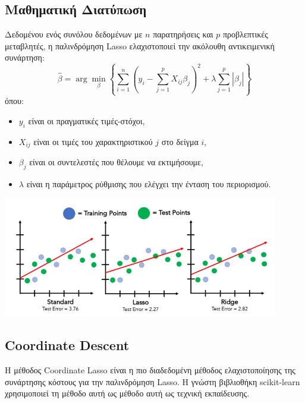\documentclass[12pt]{article}
\begin{document}
\subsection{Μαθηματική Διατύπωση}
Δεδομένου ενός συνόλου δεδομένων με $n$ παρατηρήσεις και $p$ προβλεπτικές μεταβλητές, η παλινδρόμηση \textlatin{Lasso} ελαχιστοποιεί την ακόλουθη αντικειμενική συνάρτηση:
\begin{equation}
    \hat{\beta} = \arg \min_{\beta} \left\{ \sum_{i=1}^{n} (y_i - \sum_{j=1}^{p} X_{ij} \beta_j)^2 + \lambda \sum_{j=1}^{p} |\beta_j| \right\}
\end{equation}
όπου:
\begin{itemize}
    \item $y_i$ είναι οι πραγματικές τιμές-στόχοι,
    \item $X_{ij}$ είναι οι τιμές του χαρακτηριστικού $j$ στο δείγμα $i$,
    \item $\beta_j$ είναι οι συντελεστές που θέλουμε να εκτιμήσουμε,
    \item $\lambda$ είναι η παράμετρος ρύθμισης που ελέγχει την ένταση του περιορισμού.
\end{itemize}

\begin{center}
    \includegraphics[width=0.9\textwidth]{./images/Lasso.png}
    
\end{center}

\subsection{\textlatin{Coordinate Descent}}
Η μέθοδος \textlatin{Coordinate Lasso} είναι η πιο διαδεδομένη μέθοδος ελαχιστοποίησης της συνάρτησης κόστους για την παλινδρόμηση \textlatin{Lasso}. Η γνώστη βιβλιοθήκη \textlatin{scikit-learn} χρησιμοποιεί τη μέθοδο αυτή ως μέθοδο αυτή ως τεχνική εκπαίδευσης.\\
\vspace{0.1pt}\\
\end{document}
